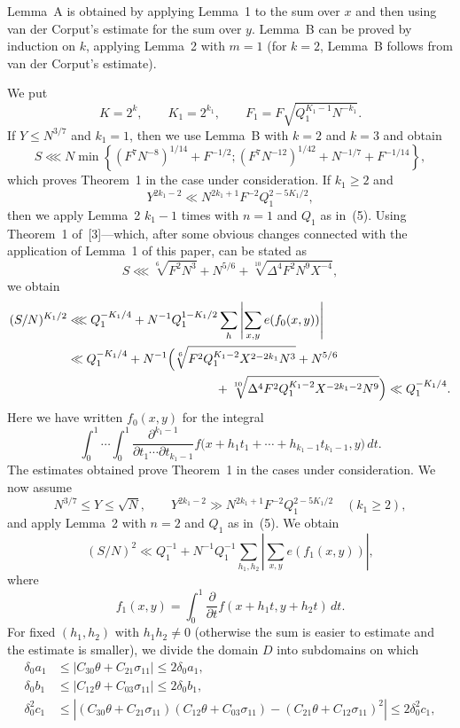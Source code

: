 \documentclass[10pt]{article}
\begin{document}
Lemma~A is obtained by applying Lemma~1 to the sum over $x$ and then using van der Corput's estimate for the sum over $y$. Lemma~B can be proved by induction on $k$, applying Lemma~2 with $m=1$ (for $k=2$, Lemma~B follows from van der Corput's estimate).

We put
\[
  K=2^k,\qquad K_1=2^{k_1},\qquad
  F_1=F\sqrt{Q_1^{K_1-1}N^{-k_1}}.
\]
If $Y\leqslant N^{3/7}$ and $k_1=1$, then we use Lemma~B with $k=2$ and $k=3$ and obtain
\[
  S\lll N\min\left\{
    (F^7N^{-8})^{1/14}+F^{-1/2};
    (F^7N^{-12})^{1/42}+N^{-1/7}+F^{-1/14}
  \right\},
\]
which proves Theorem~1 in the case under consideration. If $k_1\geqslant2$ and
\[
  Y^{2k_1-2}\ll N^{2k_1+1}F^{-2}Q_1^{2-5K_1/2},
\]
then we apply Lemma~2 $k_1-1$ times with $n=1$ and $Q_1$ as in~(5). Using Theorem~1 of~[3]---which, after some obvious changes connected with the application of Lemma~1 of this paper, can be stated as
\[
  S\lll \sqrt[6]{F^2N^3}+N^{5/6}
       +\sqrt[10]{\Delta^4F^2N^9X^{-4}},
\]
we obtain
\[
\begin{aligned}
(S/N)^{K_1/2}
&\lll Q_1^{-K_1/4}
 +N^{-1}Q_1^{1-K_1/2}
   \sum_h\left\lvert\sum_{x,y}e(f_0(x,y))\right\rvert\\
&\ll Q_1^{-K_1/4}+N^{-1}\Bigl(
 \sqrt[6]{F^2Q_1^{K_1-2}X^{2-2k_1}N^3}+N^{5/6}\\
&\hspace{42mm}
 +\sqrt[10]{\Delta^4F^2Q_1^{K_1-2}X^{-2k_1-2}N^9}
 \Bigr)
\ll Q_1^{-K_1/4}.
\end{aligned}
\]
Here we have written $f_0(x,y)$ for the integral
\[
  \int_0^1\!\cdots\!\int_0^1
  \frac{\partial^{k_1-1}}{\partial t_1\cdots\partial t_{k_1-1}}
  f\bigl(x+h_1t_1+\cdots+h_{k_1-1}t_{k_1-1},y\bigr)\,dt.
\]
The estimates obtained prove Theorem~1 in the cases under consideration. We now assume
\[
  N^{3/7}\leqslant Y\leqslant\sqrt N,
  \qquad
  Y^{2k_1-2}\gg N^{2k_1+1}F^{-2}Q_1^{2-5K_1/2}
  \quad(k_1\geqslant2),
\]
and apply Lemma~2 with $n=2$ and $Q_1$ as in~(5). We obtain
\[
  (S/N)^2\ll Q_1^{-1}
  +N^{-1}Q_1^{-1}\sum_{h_1,h_2}
   \left\lvert\sum_{x,y}e(f_1(x,y))\right\rvert,
\]
where
\[
  f_1(x,y)=\int_0^1\frac{\partial}{\partial t}
  f(x+h_1t,y+h_2t)\,dt.
\]
For fixed $(h_1,h_2)$ with $h_1h_2\ne0$ (otherwise the sum is easier to estimate and the estimate is smaller), we divide the domain $D$ into subdomains on which
\[
\begin{aligned}
\delta_0a_1&\leqslant\lvert C_{30}\theta+C_{21}\sigma_{11}\rvert
              \leqslant2\delta_0a_1,\\
\delta_0b_1&\leqslant\lvert C_{12}\theta+C_{03}\sigma_{11}\rvert
              \leqslant2\delta_0b_1,\\
\delta_0^2c_1&\leqslant
 \left\lvert
 (C_{30}\theta+C_{21}\sigma_{11})(C_{12}\theta+C_{03}\sigma_{11})
 -(C_{21}\theta+C_{12}\sigma_{11})^2
 \right\rvert
 \leqslant2\delta_0^2c_1,
\end{aligned}
\]
\end{document}
